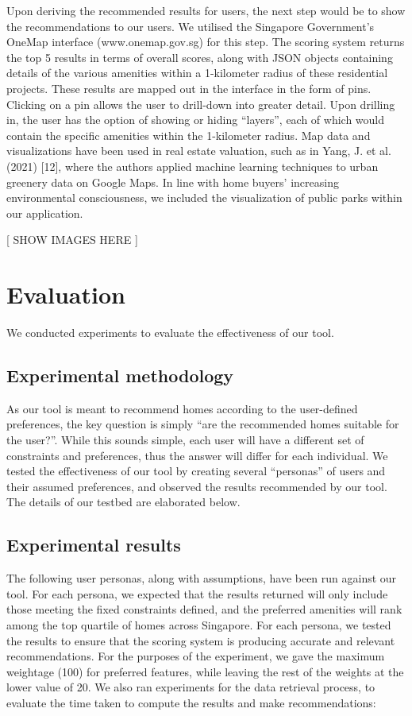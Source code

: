 \documentclass[a4paper, 11pt]{article}
\begin{document}
Upon deriving the recommended results for users, the next step would be to show the recommendations to our users. We utilised the Singapore Government’s OneMap interface (www.onemap.gov.sg) for this step. The scoring system returns the top 5 results in terms of overall scores, along with JSON objects containing details of the various amenities within a 1-kilometer radius of these residential projects. These results are mapped out in the interface in the form of pins. Clicking on a pin allows the user to drill-down into greater detail. Upon drilling in, the user has the option of showing or hiding “layers”, each of which would contain the specific amenities within the 1-kilometer radius. Map data and visualizations have been used in real estate valuation, such as in Yang, J. et al. (2021) [12], where the authors applied machine learning techniques to urban greenery data on Google Maps. In line with home buyers’ increasing environmental consciousness, we included the visualization of public parks within our application. 

[ SHOW IMAGES HERE ]

\section{Evaluation}

We conducted experiments to evaluate the effectiveness of our tool.

\subsection{Experimental methodology}

As our tool is meant to recommend homes according to the user-defined preferences, the key question is simply “are the recommended homes suitable for the user?”. While this sounds simple, each user will have a different set of constraints and preferences, thus the answer will differ for each individual. We tested the effectiveness of our tool by creating several “personas” of users and their assumed preferences, and observed the results recommended by our tool. The details of our testbed are elaborated below.

\subsection{Experimental results}

The following user personas, along with assumptions, have been run against our tool. For each persona, we expected that the results returned will only include those meeting the fixed constraints defined, and the preferred amenities will rank among the top quartile of homes across Singapore. For each persona, we tested the results to ensure that the scoring system is producing accurate and relevant recommendations. For the purposes of the experiment, we gave the maximum weightage (100) for preferred features, while leaving the rest of the weights at the lower value of 20. We also ran experiments for the data retrieval process, to evaluate the time taken to compute the results and make recommendations:
\end{document}
